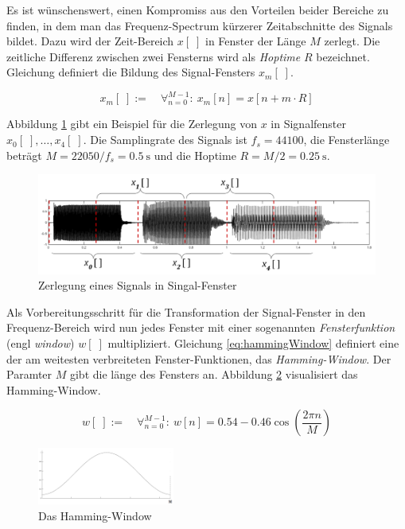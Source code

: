 Es ist wünschenswert, einen Kompromiss aus den Vorteilen beider Bereiche zu finden, in dem man das Frequenz-Spectrum kürzerer Zeitabschnitte des Signals bildet. Dazu wird der Zeit-Bereich $x[\;]$ in Fenster der Länge $M$ zerlegt. Die zeitliche Differenz zwischen zwei Fensterns wird als \emph{Hoptime} $R$ bezeichnet. Gleichung definiert die Bildung des Signal-Fensters $x_m[\;]$.\cite{juliusSmith}

 \begin{equation}
x_m[\;] := \quad \mathop{\forall}_{n = 0}^{M-1} :\ x_{m}[n] = x[n+m\cdot R]
\label{eq:signal-Window}
\end{equation}

Abbildung \ref{img:siganlWindows} gibt ein Beispiel für die Zerlegung von $x$ in Signalfenster $x_0[\;] ,\ldots, x_4[\;]$. Die Samplingrate des Signals ist $f_s = 44100$, die Fensterlänge beträgt $M = 22050 / f_s = \SI{0.5}{\second}$ und die Hoptime $R = M / 2= \SI{0.25}{\second}$.

\begin{figure}[h]
	\centering
	\includegraphics[width=1\textwidth]{bilder/signalWindows02.png}
	\caption{Zerlegung eines Signals in Singal-Fenster}
	\label{img:siganlWindows}
\end{figure}

Als Vorbereitungsschritt für die Transformation der Signal-Fenster in den Frequenz-Bereich wird nun jedes Fenster mit einer sogenannten \emph{Fensterfunktion} (engl \emph{window}) $w[\;]$ multipliziert. Gleichung \ref{eq:hammingWindow} definiert eine der am weitesten verbreiteten Fenster-Funktionen, das \emph{Hamming-Window}. Der Paramter $M$ gibt die länge des Fensters an. Abbildung 	\ref{img:hamming} visualisiert das Hamming-Window. \cite[S. 286]{dspGuide}

 \begin{equation}
w[\;] := \quad \mathop{\forall}_{n = 0}^{M-1} :\ w[n] = 0.54 - 0.46 \cos(\frac{2\pi n}{M} )
\label{eq:hammingWindow}
\end{equation}

 \begin{figure}[h]
	\centering
	\includegraphics[width=0.4\textwidth]{bilder/hamming01.png}
	\caption{Das Hamming-Window}
	\label{img:hamming}
\end{figure}

